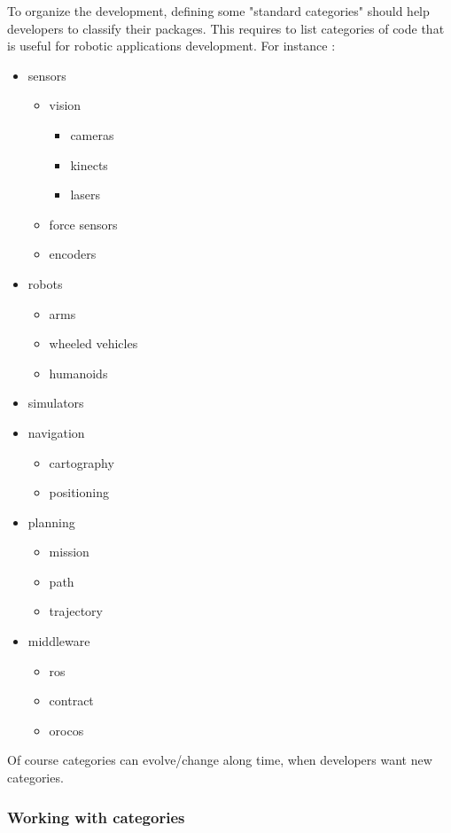 \documentclass[12pt,a4paper]{article}
\begin{document}
To organize the development, defining some "standard categories" should help developers to classify their packages. This requires to list categories of code that is useful for robotic applications development. For instance :
\begin{itemize}
\item sensors
\begin{itemize}
\item vision
\begin{itemize}
\item cameras
\item kinects
\item lasers
\end{itemize}
\item force sensors
\item encoders
\end{itemize}
\item robots
\begin{itemize}
\item arms
\item wheeled vehicles
\item humanoids
\end{itemize}
\item simulators
\item navigation
\begin{itemize}
\item cartography
\item positioning
\end{itemize}
\item planning
\begin{itemize}
\item mission
\item path
\item trajectory
\end{itemize}
\item middleware
\begin{itemize}
\item ros
\item contract
\item orocos
\end{itemize}
\end{itemize}

Of course categories can evolve/change along time, when developers want new categories.

\subsubsection{Working with categories}
\end{document}
